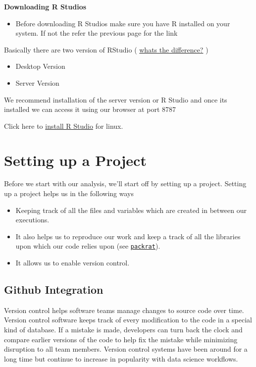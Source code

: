\documentclass[]{book}
\providecommand{\tightlist}{%
  \setlength{\itemsep}{0pt}\setlength{\parskip}{0pt}}
\theoremstyle{definition}
\theoremstyle{definition}
\theoremstyle{definition}
\theoremstyle{remark}
\begin{document}
\textbf{Downloading R Studios}

\begin{itemize}
\tightlist
\item
  Before downloading R Studios make sure you have R installed on your
  system. If not the refer the previous page for the link
\end{itemize}

Basically there are two version of RStudio (
\href{https://support.rstudio.com/hc/en-us/articles/217799198-What-is-the-difference-between-RStudio-Desktop-and-RStudio-Server-}{whats
the difference?} )

\begin{itemize}
\item
  Desktop Version
\item
  Server Version
\end{itemize}

We recommend installation of the server version or R Studio and once its
installed we can access it using our browser at port 8787

Click here to
\href{https://www.rstudio.com/products/rstudio/download-server/}{install
R Studio} for linux.

\chapter{Setting up a Project}\label{setting-up-a-project}

Before we start with our analysis, we'll start off by setting up a
project. Setting up a project helps us in the following ways

\begin{itemize}
\tightlist
\item
  Keeping track of all the files and variables which are created in
  between our executions.
\item
  It also helps us to reproduce our work and keep a track of all the
  libraries upon which our code relies upon (see
  \href{https://github.com/rstudio/packrat}{\texttt{packrat}}).
\item
  It allows us to enable version control.
\end{itemize}

\section{Github Integration}\label{github-integration}

Version control helps software teams manage changes to source code over
time. Version control software keeps track of every modification to the
code in a special kind of database. If a mistake is made, developers can
turn back the clock and compare earlier versions of the code to help fix
the mistake while minimizing disruption to all team members. Version
control systems have been around for a long time but continue to
increase in popularity with data science workflows.
\end{document}
